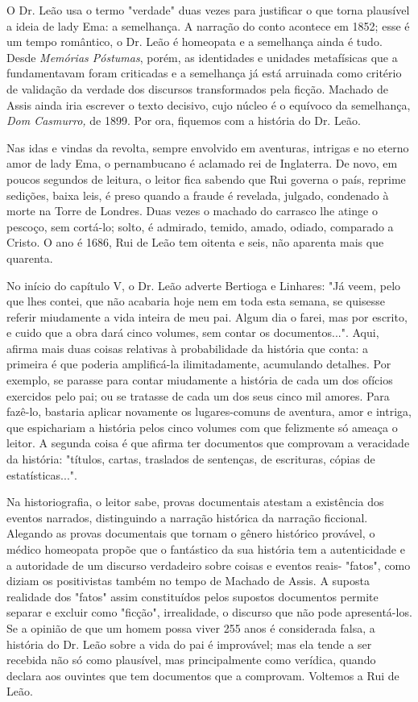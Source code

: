 O Dr. Leão usa o termo "verdade" duas vezes para justificar o que torna
plausível a ideia de lady Ema: a semelhança. A narração do conto
acontece em 1852; esse é um tempo romântico, o Dr. Leão é homeopata e a
semelhança ainda é tudo. Desde \emph{Memórias Póstumas}, porém, as
identidades e unidades metafísicas que a fundamentavam foram criticadas
e a semelhança já está arruinada como critério de validação da verdade
dos discursos transformados pela ficção. Machado de Assis ainda iria
escrever o texto decisivo, cujo núcleo é o equívoco da semelhança,
\emph{Dom Casmurro,} de 1899. Por ora, fiquemos com a história do Dr.
Leão.

Nas idas e vindas da revolta, sempre envolvido em aventuras, intrigas e
no eterno amor de lady Ema, o pernambucano é aclamado rei de Inglaterra.
De novo, em poucos segundos de leitura, o leitor fica sabendo que Rui
governa o país, reprime sedições, baixa leis, é preso quando a fraude é
revelada, julgado, condenado à morte na Torre de Londres. Duas vezes o
machado do carrasco lhe atinge o pescoço, sem cortá-lo; solto, é
admirado, temido, amado, odiado, comparado a Cristo. O ano é 1686, Rui
de Leão tem oitenta e seis, não aparenta mais que quarenta.

No início do capítulo V, o Dr. Leão adverte Bertioga e Linhares: "Já
veem, pelo que lhes contei, que não acabaria hoje nem em toda esta
semana, se quisesse referir miudamente a vida inteira de meu pai. Algum
dia o farei, mas por escrito, e cuido que a obra dará cinco volumes, sem
contar os documentos...". Aqui, afirma mais duas coisas relativas à
probabilidade da história que conta: a primeira é que poderia
amplificá-la ilimitadamente, acumulando detalhes. Por exemplo, se
parasse para contar miudamente a história de cada um dos ofícios
exercidos pelo pai; ou se tratasse de cada um dos seus cinco mil amores.
Para fazê-lo, bastaria aplicar novamente os lugares-comuns de aventura,
amor e intriga, que espichariam a história pelos cinco volumes com que
felizmente só ameaça o leitor. A segunda coisa é que afirma ter
documentos que comprovam a veracidade da história: "títulos, cartas,
traslados de sentenças, de escrituras, cópias de estatísticas...".

Na historiografia, o leitor sabe, provas documentais atestam a
existência dos eventos narrados, distinguindo a narração histórica da
narração ficcional. Alegando as provas documentais que tornam o gênero
histórico provável, o médico homeopata propõe que o fantástico da sua
história tem a autenticidade e a autoridade de um discurso verdadeiro
sobre coisas e eventos reais- "fatos", como diziam os positivistas
também no tempo de Machado de Assis. A suposta realidade dos "fatos"
assim constituídos pelos supostos documentos permite separar e excluir
como "ficção", irrealidade, o discurso que não pode apresentá-los. Se a
opinião de que um homem possa viver 255 anos é considerada falsa, a
história do Dr. Leão sobre a vida do pai é improvável; mas ela tende a
ser recebida não só como plausível, mas principalmente como verídica,
quando declara aos ouvintes que tem documentos que a comprovam. Voltemos
a Rui de Leão.

